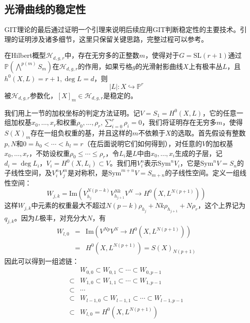 \subsection{光滑曲线的稳定性}
GIT理论的最后通过证明一个引理来说明后续应用GIT判断稳定性的主要技术。引理的证明涉及诸多细节，这里只保留关键思路，完整过程可以参考\cite{GeometryAlgCurvesII,ModuliofCurves,LecturesonModuliofCurves}。
\begin{theorem}[\cite{GeometryAlgCurvesII}\uppercase\expandafter{\romannumeral14}.Theorem3.2]\label{smstable}
	在Hilbert概型$ \mathcal{H}_{d,g,r} $中，存在无穷多的正整数$ m $，使得对于$ G=\mathrm{SL}(r+1) $通过$ \mathbb{P}(\bigwedge^{p(m)}S_m) $在$ \mathcal{H}_{d,g,r} $的作用，如果亏格$ g $的光滑射影曲线$ X $上有极丰丛$ L $，且$ h^0(X,L)=r+1,\deg L=d $，则
	$$ |L|:X\hookrightarrow \mathbb{P}^r $$
	被$ \mathcal{H}_{d,g,r} $参数化，$ [X]_m\in \mathcal{H}_{d,g,r} $是稳定的。
\end{theorem}
我们用上一节的加权坐标的判定方法证明。记$ V=S_1=H^0(X,L) $，它的任意一组加权基$ x_0,\ldots,x_r $和权重$ \rho_0,\ldots,\rho_r,\sum_{i=0}^{r}\rho_i=0 $，我们将证明存在无穷多$ m $，使得$ S(X)_m $存在一组负权重的基，并且这样的$ m $不依赖于$ X $的选取。首先假设有整数$ p,N $和$ 0=h_0<\cdots<h_l=r $（在后面说明它们如何得到），对任意的$ V $的加权基$ x_0,\ldots,x_r $，不妨设权重$ \rho_0\leqslant\cdots \leqslant \rho_r $，令$ L_i $是$ L $中由$ x_0,\ldots,x_i $生成的子层，记$ d_i=\deg L_i $，$ V_i=H^0(X,L_i)\subset V $。我们用$ V_i^n $表示$ \mathrm{Sym}^nV_i $，它是$ \mathrm{Sym}^nV=S_n $的子线性空间，及$ V_i^nV_j^m $是对称积，是$ \mathrm{Sym}^{m+n}V=S_{m+n} $的子线性空间。定义一组线性空间：
$$ W_{j,k}=\mathrm{Im}\left(  V_{h_j}^{N(p-k)}V_{h_{j+1}}^{Nk}V^N\to H^0(X,L^{N(p+1)})   \right) $$
这样$ W_{j,k} $中元素的权重最大不超过$ N(p-k)\rho_{h_j}+Nk\rho_{h_{j+1}}+N\rho_r $，这个上界记为$ q_{j,k} $。因为$ L $极丰，对充分大$ N $，有
\begin{equation*}
\begin{array}{rcl}
W_{l,0}&=&\mathrm{Im}\left( V^{Np}V^N\to H^0(X,L^{N(p+1)})\right) \\
&=&H^0(X,L^{N(p+1)})=S(X)_{N(p+1)}    
\end{array}
\end{equation*}
因此可以得到一组滤链：
\begin{equation*}
\begin{array}{rl}
& W_{0,0}\subset W_{0,1}\subset\cdots \subset W_{0,p-1}\\
\subset &W_{1,0}\subset W_{1,1}\subset\cdots \subset W_{1,p-1}\\
\subset&\cdots\\
\subset&W_{l-1,0}\subset W_{l-1,1}\subset\cdots \subset W_{l-1,p-1}\\
\subset&W_{l,0}=H^0(X,L^{N(p+1)})
\end{array}
\end{equation*}
